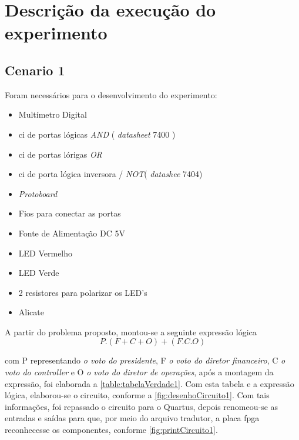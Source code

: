 
\chapter{Descrição da execução do experimento}

\section{Cenario 1}

	Foram necessários para o desenvolvimento do experimento:
	\begin{itemize}
		\item Multímetro Digital
		\item \ac{ci} de portas lógicas \textit{AND} ( \textit{datasheet} 7400 )
		\item \ac{ci} de portas lórigas \textit{OR}
		\item \ac{ci} de porta lógica inversora / \textit{NOT}( \textit{datashee} 7404)
		\item \textit{Protoboard}
		\item Fios para conectar as portas
		\item Fonte de Alimentação DC 5V
		\item LED Vermelho
		\item LED Verde
		\item 2 resistores para polarizar os LED’s
		\item Alicate
	\end{itemize}

	A partir do problema proposto, montou-se a seguinte expressão lógica
	$$ P . ( F + C + O) + (F . C . O)$$

	com P representando \textit{o voto do presidente}, F
	\textit{o voto do diretor financeiro}, C
	\textit{o voto do controller} e O \textit{o voto do diretor de operações}, após a
	montagem da expressão, foi elaborada a \autoref{table:tabelaVerdade1}. Com esta tabela e a expressão lógica,
	elaborou-se o circuito, conforme a \autoref{fig:desenhoCircuito1}. Com tais informações, foi repassado o circuito
	para o Quartus, depois renomeou-se as entradas e saídas para que, por meio do arquivo tradutor, a placa
	\ac{fpga} reconhecesse os componentes, conforme \autoref{fig:printCircuito1}.

